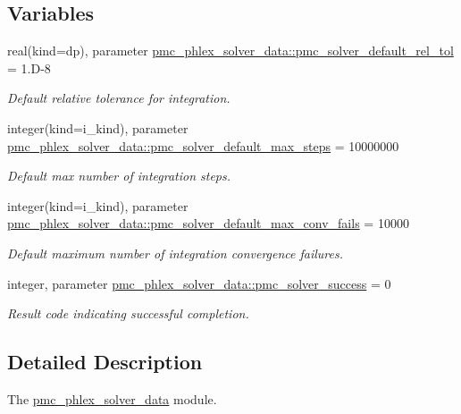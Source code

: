 \subsection*{Variables}
\begin{DoxyCompactItemize}
\item 
real(kind=dp), parameter \mbox{\hyperlink{namespacepmc__phlex__solver__data_a680944ec13286ae1045e6d9ba2e630b6}{pmc\+\_\+phlex\+\_\+solver\+\_\+data\+::pmc\+\_\+solver\+\_\+default\+\_\+rel\+\_\+tol}} = 1.\+D-\/8
\begin{DoxyCompactList}\small\item\em Default relative tolerance for integration. \end{DoxyCompactList}\item 
integer(kind=i\+\_\+kind), parameter \mbox{\hyperlink{namespacepmc__phlex__solver__data_a62a47f32de1d137a90a46c5fb6716347}{pmc\+\_\+phlex\+\_\+solver\+\_\+data\+::pmc\+\_\+solver\+\_\+default\+\_\+max\+\_\+steps}} = 10000000
\begin{DoxyCompactList}\small\item\em Default max number of integration steps. \end{DoxyCompactList}\item 
integer(kind=i\+\_\+kind), parameter \mbox{\hyperlink{namespacepmc__phlex__solver__data_ad1ee88ba9b3c6a966bacb508b9be226b}{pmc\+\_\+phlex\+\_\+solver\+\_\+data\+::pmc\+\_\+solver\+\_\+default\+\_\+max\+\_\+conv\+\_\+fails}} = 10000
\begin{DoxyCompactList}\small\item\em Default maximum number of integration convergence failures. \end{DoxyCompactList}\item 
integer, parameter \mbox{\hyperlink{namespacepmc__phlex__solver__data_a0f2dcefeefc3ce9e4eb9e337c5203054}{pmc\+\_\+phlex\+\_\+solver\+\_\+data\+::pmc\+\_\+solver\+\_\+success}} = 0
\begin{DoxyCompactList}\small\item\em Result code indicating successful completion. \end{DoxyCompactList}\end{DoxyCompactItemize}


\subsection{Detailed Description}
The \mbox{\hyperlink{namespacepmc__phlex__solver__data}{pmc\+\_\+phlex\+\_\+solver\+\_\+data}} module. 



